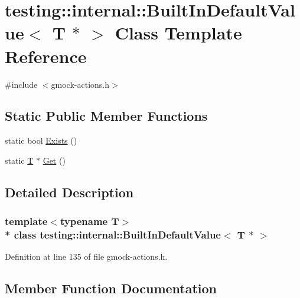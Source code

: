 \hypertarget{classtesting_1_1internal_1_1_built_in_default_value_3_01_t_01_5_01_4}{}\section{testing\+:\+:internal\+:\+:Built\+In\+Default\+Value$<$ T $\ast$ $>$ Class Template Reference}
\label{classtesting_1_1internal_1_1_built_in_default_value_3_01_t_01_5_01_4}


{\ttfamily \#include $<$gmock-\/actions.\+h$>$}

\subsection*{Static Public Member Functions}
\begin{DoxyCompactItemize}
\item 
static bool \hyperlink{classtesting_1_1internal_1_1_built_in_default_value_3_01_t_01_5_01_4_aafa7172f63d068305fb37d5db40bb543}{Exists} ()
\item 
static \hyperlink{functions__7_8js_adf1f3edb9115acb0a1e04209b7a9937b}{T} $\ast$ \hyperlink{classtesting_1_1internal_1_1_built_in_default_value_3_01_t_01_5_01_4_adc2fa2bdae767589d171ae3a117e3a9f}{Get} ()
\end{DoxyCompactItemize}


\subsection{Detailed Description}
\subsubsection*{template$<$typename T$>$\\*
class testing\+::internal\+::\+Built\+In\+Default\+Value$<$ T $\ast$ $>$}



Definition at line 135 of file gmock-\/actions.\+h.



\subsection{Member Function Documentation}
